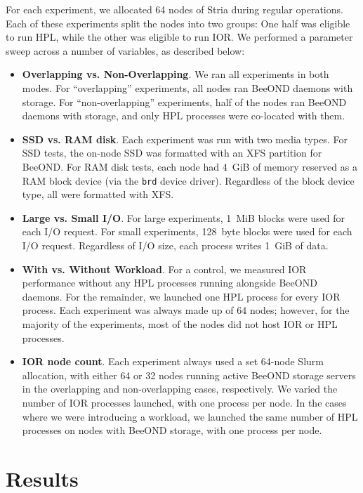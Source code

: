 \documentclass[conference]{IEEEtran}
\begin{document}
For each experiment, we allocated 64 nodes of Stria during regular
operations. Each of these experiments split the nodes into two
groups: One half was eligible to run HPL, while the other was eligible
to run IOR. We performed a parameter sweep across a number of
variables, as described below:
\begin{itemize}
  \item {\bf Overlapping vs. Non-Overlapping}. We ran all experiments
    in both modes. For ``overlapping'' experiments, all nodes ran
    BeeOND daemons with storage. For ``non-overlapping'' experiments,
    half of the nodes ran BeeOND daemons with storage, and only HPL
    processes were co-located with them.
  \item {\bf SSD vs. RAM disk}. Each experiment was run with two media
    types. For SSD tests, the on-node SSD was formatted with an XFS
    partition for BeeOND. For RAM disk tests, each node had 4~GiB of
    memory reserved as a RAM block device (via the {\tt brd} device
    driver). Regardless of the block device type, all were formatted
    with XFS.
  \item {\bf Large vs. Small I/O}. For large experiments, 1~MiB blocks
    were used for each I/O request. For small experiments, 128~byte
    blocks were used for each I/O request. Regardless of I/O size,
    each process writes 1~GiB of data.
  \item {\bf With vs. Without Workload}. For a control, we measured
    IOR performance without any HPL processes running alongside BeeOND
    daemons. For the remainder, we launched one HPL process for every
    IOR process. Each experiment was always made up of 64 nodes;
    however, for the majority of the experiments, most of the nodes
    did not host IOR or HPL processes.
  \item {\bf IOR node count}. Each experiment always used a set 64-node
    Slurm allocation, with either 64 or 32 nodes running active BeeOND storage servers
    in the overlapping and non-overlapping cases, respectively. We varied the
    number of IOR processes launched, with one process per node. In
    the cases where we were introducing a workload, we launched the
    same number of HPL processes on nodes with BeeOND storage, with one process per
    node.
\end{itemize}

\section {Results}
\label{s:results}
\end{document}
